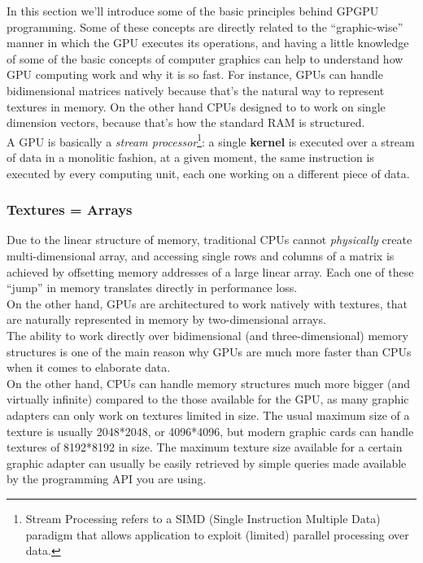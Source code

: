 In this section we'll introduce some of the basic principles behind GPGPU programming. Some of these concepts are directly related to the ``graphic-wise'' manner in which the GPU executes its operations, and having a little knowledge of some of the basic concepts of computer graphics can help to understand how GPU computing work and why it is so fast. For instance, GPUs can handle bidimensional matrices natively because that's the natural way to represent textures in memory. On the other hand CPUs designed to to work on single dimension vectors, because that's how the standard RAM is structured.\\
A GPU is basically a \textit{stream processor}\footnote{Stream Processing refers to a SIMD (Single Instruction Multiple Data) paradigm that allows application to exploit (limited) parallel processing over data.}: a single \textbf{kernel} is executed over a stream of data in a monolitic fashion, at a given moment, the same instruction is executed by every computing unit, each one working on a different piece of data.

\subsubsection{Textures = Arrays}
Due to the linear structure of memory, traditional CPUs cannot \emph{physically} create multi-dimensional array, and accessing single rows and columns of a matrix is achieved by offsetting memory addresses of a large linear array. Each one of these ``jump'' in memory translates directly in performance loss.\\
On the other hand, GPUs are architectured to work natively with textures, that are naturally represented in memory by two-dimensional arrays.\\
The ability to work directly over bidimensional (and three-dimensional) memory structures is one of the main reason why GPUs are much more faster than CPUs when it comes to elaborate data.\\
On the other hand, CPUs can handle memory structures much more bigger (and virtually infinite) compared to the those available for the GPU, as many graphic adapters can only work on textures limited in size. The usual maximum size of a texture is usually 2048*2048, or 4096*4096, but modern graphic cards can handle textures of 8192*8192 in size.
The maximum texture size available for a certain graphic adapter can usually be easily retrieved by simple queries made available by the programming API you are using.

